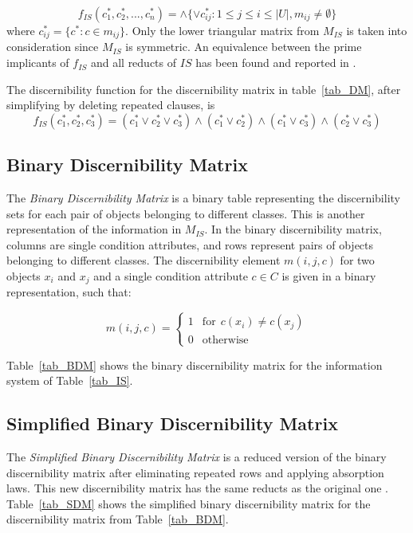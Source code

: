 \documentclass[citenumber]{llncs}
\begin{document}
  $$
  	f_{IS}(c_1^*, c_2^*,...,c_n^*)=\wedge \lbrace \vee c_{ij}^* : 1 \leq j \leq i \leq |U|, 
  									m_{ij} \neq \emptyset \rbrace
  $$\newline
  where $c_{ij}^*=\lbrace c^* : c \in m_{ij} \rbrace$. Only the lower triangular matrix from $M_{IS}$ is
  taken into consideration since $M_{IS}$ is symmetric. An equivalence between the prime implicants of
  $f_{IS}$ and all reducts of $IS$ has been found and reported in \cite{Pawlak07}.
  
  The discernibility function for the discernibility matrix in table~\ref{tab_DM}, after simplifying by 
  deleting repeated clauses, is  
  $$f_{IS}(c_1^*,c_2^*,c_3^*)=(c_1^* \vee c_2^* \vee c_3^*) \wedge (c_1^* \vee c_2^*) 
   \wedge (c_1^* \vee c_3^*) \wedge (c_2^* \vee c_3^*) $$
  
  
\subsection{Binary Discernibility Matrix}
  The \textit{Binary Discernibility Matrix} is a binary table representing the discernibility sets for each pair of objects belonging to different classes. This is another representation of the information in $M_{IS}$. In the binary discernibility matrix, columns are single condition attributes, and rows represent pairs of objects belonging to different classes. The discernibility element $m(i, j, c)$ for two objects $x_i$ and $x_j$ and a single condition attribute $c \in C$ is given in a binary representation, such that:
  
  \begin{equation}
  	m(i, j, c)=\left\lbrace\begin{array}{cl}
  			1 & \mathrm{for~~}c(x_i) \neq c(x_j)\\
  			0 & \mathrm{otherwise} 
  	\end{array}\right.
  \end{equation} 
  
  Table~\ref{tab_BDM} shows the binary discernibility matrix for the information system of Table~\ref{tab_IS}.  
  
  
\subsection{Simplified Binary Discernibility Matrix}
  The \textit{Simplified Binary Discernibility Matrix} is a reduced version of the binary discernibility matrix after
  eliminating repeated rows and applying absorption laws. This new discernibility matrix has the same reducts
  as the original one \cite{Yao09}. Table~\ref{tab_SDM} shows the simplified binary discernibility matrix for the
  discernibility matrix from Table~\ref{tab_BDM}.
  
\end{document}

